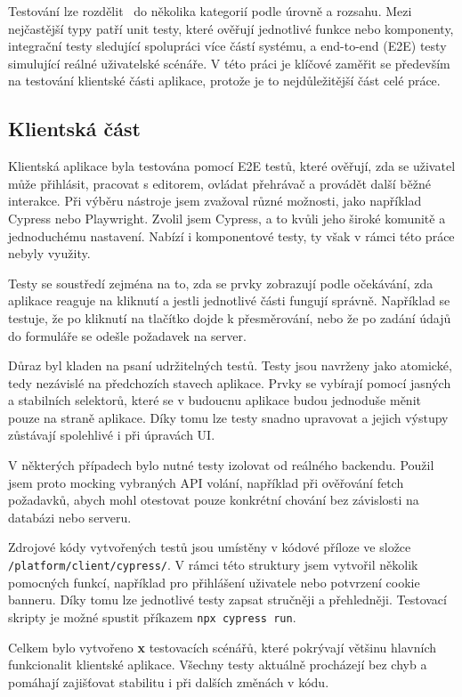 Testování lze rozdělit~\cite{meszaros_2007} do několika kategorií podle úrovně a rozsahu. 
Mezi nejčastější typy patří unit testy, které ověřují jednotlivé funkce nebo komponenty, integrační testy sledující spolupráci více částí systému, a end-to-end (E2E) testy simulující reálné uživatelské scénáře. 
V této práci je klíčové zaměřit se především na testování klientské části aplikace, protože je to nejdůležitější část celé práce.

\subsection{Klientská část}

Klientská aplikace byla testována pomocí E2E testů, které ověřují, zda se uživatel může přihlásit, pracovat s editorem, ovládat přehrávač a provádět další běžné interakce. 
Při výběru nástroje jsem zvažoval různé možnosti, jako například Cypress nebo Playwright. 
Zvolil jsem Cypress, a to kvůli jeho široké komunitě a jednoduchému nastavení.
Nabízí i komponentové testy, ty však v rámci této práce nebyly využity.

Testy se soustředí zejména na to, zda se prvky zobrazují podle očekávání, zda aplikace reaguje na kliknutí a jestli jednotlivé části fungují správně.
Například se testuje, že po kliknutí na tlačítko dojde k přesměrování, nebo že po zadání údajů do formuláře se odešle požadavek na server.

Důraz byl kladen na psaní udržitelných testů. 
Testy jsou navrženy jako atomické, tedy nezávislé na předchozích stavech aplikace. 
Prvky se vybírají pomocí jasných a stabilních selektorů, které se v budoucnu aplikace budou jednoduše měnit pouze na straně aplikace.
Díky tomu lze testy snadno upravovat a jejich výstupy zůstávají spolehlivé i při úpravách UI.

V některých případech bylo nutné testy izolovat od reálného backendu.
Použil jsem proto mocking vybraných API volání, například při ověřování fetch požadavků, abych mohl otestovat pouze konkrétní chování bez závislosti na databázi nebo serveru.

Zdrojové kódy vytvořených testů jsou umístěny v kódové příloze ve složce \texttt{/platform/client/cypress/}. 
V rámci této struktury jsem vytvořil několik pomocných funkcí, například pro přihlášení uživatele nebo potvrzení cookie banneru. 
Díky tomu lze jednotlivé testy zapsat stručněji a přehledněji.
Testovací skripty je možné spustit příkazem \verb|npx cypress run|.

Celkem bylo vytvořeno \textbf{x} testovacích scénářů, které pokrývají většinu hlavních funkcionalit klientské aplikace. 
Všechny testy aktuálně procházejí bez chyb a pomáhají zajišťovat stabilitu i při dalších změnách v kódu.

